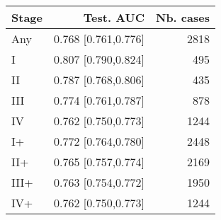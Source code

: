 \begin{table}[ht]
\centering
\begin{tabular}{lrr}
  \toprule
Stage & Test. AUC & Nb. cases \\ 
  \midrule
Any & 0.768 [0.761,0.776] & 2818 \\ 
   \addlinespace
I & 0.807 [0.790,0.824] & 495 \\ 
  II & 0.787 [0.768,0.806] & 435 \\ 
  III & 0.774 [0.761,0.787] & 878 \\ 
  IV & 0.762 [0.750,0.773] & 1244 \\ 
   \addlinespace
I+ & 0.772 [0.764,0.780] & 2448 \\ 
  II+ & 0.765 [0.757,0.774] & 2169 \\ 
  III+ & 0.763 [0.754,0.772] & 1950 \\ 
  IV+ & 0.762 [0.750,0.773] & 1244 \\ 
   \bottomrule
\end{tabular}
\end{table}
